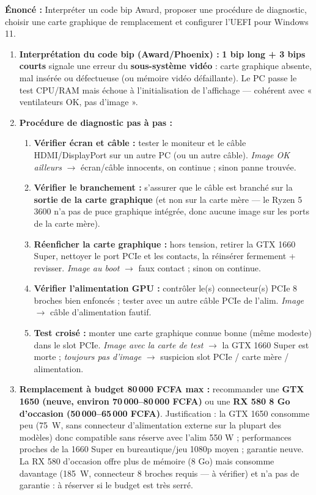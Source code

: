\documentclass[11pt]{article}
\begin{document}
\begin{corrige}
\textbf{Énoncé :} Interpréter un code bip Award, proposer une procédure de diagnostic, choisir une carte graphique de remplacement et configurer l'UEFI pour Windows 11.
\tcblower
\begin{enumerate}
    \item \textbf{Interprétation du code bip (Award/Phoenix) :} \textbf{1 bip long + 3 bips courts} signale une erreur du \textbf{sous-système vidéo} : carte graphique absente, mal insérée ou défectueuse (ou mémoire vidéo défaillante). Le PC passe le test CPU/RAM mais échoue à l'initialisation de l'affichage — cohérent avec « ventilateurs OK, pas d'image ».
    \item \textbf{Procédure de diagnostic pas à pas :}
    \begin{enumerate}
        \item \textbf{Vérifier écran et câble :} tester le moniteur et le câble HDMI/DisplayPort sur un autre PC (ou un autre câble). \emph{Image OK ailleurs} $\rightarrow$ écran/câble innocents, on continue ; sinon panne trouvée.
        \item \textbf{Vérifier le branchement :} s'assurer que le câble est branché sur la \textbf{sortie de la carte graphique} (et non sur la carte mère — le Ryzen 5 3600 n'a pas de puce graphique intégrée, donc aucune image sur les ports de la carte mère).
        \item \textbf{Réenficher la carte graphique :} hors tension, retirer la GTX 1660 Super, nettoyer le port PCIe et les contacts, la réinsérer fermement + revisser. \emph{Image au boot} $\rightarrow$ faux contact ; sinon on continue.
        \item \textbf{Vérifier l'alimentation GPU :} contrôler le(s) connecteur(s) PCIe 8 broches bien enfoncés ; tester avec un autre câble PCIe de l'alim. \emph{Image} $\rightarrow$ câble d'alimentation fautif.
        \item \textbf{Test croisé :} monter une carte graphique connue bonne (même modeste) dans le slot PCIe. \emph{Image avec la carte de test} $\rightarrow$ la GTX 1660 Super est morte ; \emph{toujours pas d'image} $\rightarrow$ suspicion slot PCIe / carte mère / alimentation.
    \end{enumerate}
    \item \textbf{Remplacement à budget 80\,000 FCFA max :} recommander une \textbf{GTX 1650 (neuve, environ 70\,000--80\,000 FCFA)} ou une \textbf{RX 580 8 Go d'occasion (50\,000--65\,000 FCFA)}. Justification : la GTX 1650 consomme peu (\SI{75}{W}, sans connecteur d'alimentation externe sur la plupart des modèles) donc compatible sans réserve avec l'alim 550 W ; performances proches de la 1660 Super en bureautique/jeu 1080p moyen ; garantie neuve. La RX 580 d'occasion offre plus de mémoire (8 Go) mais consomme davantage (\SI{185}{W}, connecteur 8 broches requis — à vérifier) et n'a pas de garantie : à réserver si le budget est très serré.

\end{enumerate}
\end{corrige}
\end{document}
